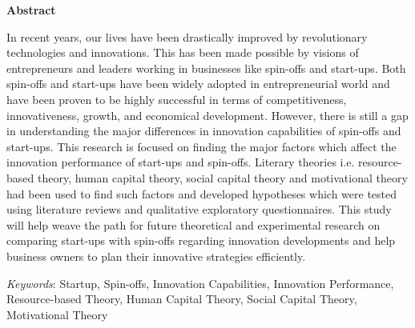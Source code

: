 \thispagestyle{empty}
\vspace*{1.0cm}

\begin{center}
    \textbf{Abstract}
\end{center}

\vspace*{0.5cm}

\noindent
In recent years, our lives have been drastically improved by revolutionary technologies and
innovations. This has been made possible by visions of entrepreneurs and leaders working in
businesses like spin-offs and start-ups. Both spin-offs and start-ups have been widely adopted in
entrepreneurial world and have been proven to be highly successful in terms of competitiveness,
innovativeness, growth, and economical development. However, there is still a gap in understanding the
major differences in innovation capabilities of spin-offs and start-ups. This research is focused
on finding the major factors which affect the innovation performance of start-ups
and spin-offs. Literary theories i.e. resource-based theory, human capital theory, social capital theory and motivational theory had been used
to find such factors and developed hypotheses which were tested using literature reviews and qualitative exploratory questionnaires. 
This study will help weave the path for future theoretical and experimental research on
comparing start-ups with spin-offs regarding innovation developments and help business owners to plan their innovative
strategies efficiently.
\\
\medskip


\medskip
\noindent \textit{Keywords}: Startup, Spin-offs, Innovation Capabilities, Innovation Performance, Resource-based Theory, Human Capital Theory, Social Capital Theory, Motivational Theory
